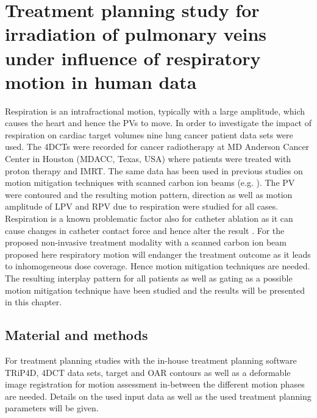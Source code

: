 \documentclass[type=dr, dr=rernat, accentcolor=tud7b,colorbacktitle, bigchapter, openright, twoside, 12pt ]{tudthesis}
\begin{document}
\dominitoc
\setcounter{tocdepth}{1}
\tableofcontents
\chapter{Treatment planning study for irradiation of pulmonary veins under influence of respiratory motion in human data}
\minitoc


Respiration is an intrafractional motion, typically with a large amplitude, which causes the heart and hence the PVs to move. 
In order to investigate the impact of respiration on cardiac target volumes nine lung cancer patient data sets were used. 
The 4DCTs were recorded for cancer radiotherapy at MD Anderson Cancer Center in Houston (MDACC, Texas, USA) where patients were treated with 
proton therapy and IMRT. The same data has been used in previous studies on motion mitigation techniques with scanned carbon ion beams 
(e.g. \cite{Lue12} \cite{Woe11}). The PV were contoured and the resulting motion pattern, direction as well as motion amplitude of LPV and RPV 
due to respiration were studied for all cases. Respiration is a known problematic factor also for catheter ablation as it can cause changes 
in catheter contact force and hence alter the result \cite{Kum12}. For the proposed non-invasive treatment modality with a scanned 
carbon ion beam proposed here respiratory motion will endanger the treatment outcome as it leads to inhomogeneous dose coverage. Hence motion 
mitigation techniques are needed. The resulting interplay pattern for all patients as well as gating as a possible motion mitigation technique 
have been studied and the results will be presented in this chapter. 

\section{Material and methods}

For treatment planning studies with the in-house treatment planning software TRiP4D\cite{Ric13}, 4DCT data sets, target and OAR contours as 
well as a deformable image registration for motion assessment in-between the different motion phases are needed. Details on the used 
input data as well as the used treatment planning parameters will be given. 
\end{document}
